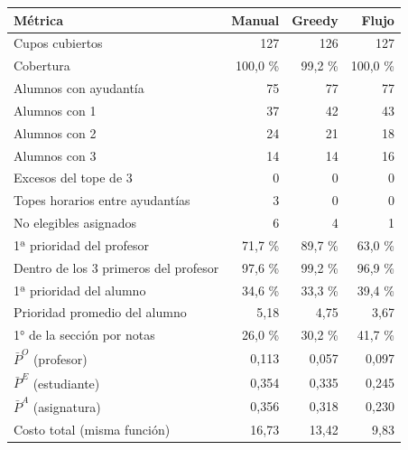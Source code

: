 \begin{tabular}{lrrr}
\toprule
\textbf{Métrica} & \textbf{Manual} & \textbf{Greedy} & \textbf{Flujo} \\
\midrule
Cupos cubiertos & 127 & 126 & 127 \\
Cobertura & 100,0 \% & 99,2 \% & 100,0 \% \\
Alumnos con ayudantía & 75 & 77 & 77 \\
Alumnos con 1 & 37 & 42 & 43 \\
Alumnos con 2 & 24 & 21 & 18 \\
Alumnos con 3 & 14 & 14 & 16 \\
Excesos del tope de 3 & 0 & 0 & 0 \\
Topes horarios entre ayudantías & 3 & 0 & 0 \\
No elegibles asignados & 6 & 4 & 1 \\
1ª prioridad del profesor & 71,7 \% & 89,7 \% & 63,0 \% \\
Dentro de los 3 primeros del profesor & 97,6 \% & 99,2 \% & 96,9 \% \\
1ª prioridad del alumno & 34,6 \% & 33,3 \% & 39,4 \% \\
Prioridad promedio del alumno & 5,18 & 4,75 & 3,67 \\
1° de la sección por notas & 26,0 \% & 30,2 \% & 41,7 \% \\
$\bar P^O$ (profesor) & 0,113 & 0,057 & 0,097 \\
$\bar P^E$ (estudiante) & 0,354 & 0,335 & 0,245 \\
$\bar P^A$ (asignatura) & 0,356 & 0,318 & 0,230 \\
Costo total (misma función) & 16,73 & 13,42 & 9,83 \\
\bottomrule
\end{tabular}

